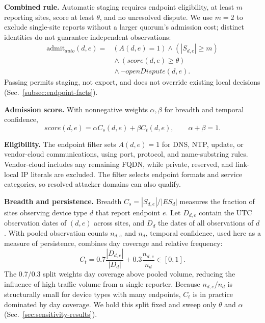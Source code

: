 \documentclass[journal]{IEEEtran}
\theoremstyle{definition}
\begin{document}
\textbf{Combined rule.} Automatic staging requires endpoint eligibility, at least $m$ reporting sites, score at least $\theta$, and no unresolved dispute. We use $m=2$ to exclude single-site reports without a larger quorum's admission cost; distinct identities do not guarantee independent observations:
\begin{equation}
\begin{aligned}
\mathrm{admit}_{auto}(d,e)
={}&(A(d,e)=1)\wedge(|S_{d,e}|\ge m)\\
 &{}\wedge(score(d,e)\ge\theta)\\
 &{}\wedge\neg openDispute(d,e).
\end{aligned}
\label{eq:admitauto}
\end{equation}
Passing permits staging, not export, and does not override existing local decisions (Sec.~\ref{subsec:endpoint-facts}).

\textbf{Admission score.} With nonnegative weights $\alpha,\beta$ for breadth and temporal confidence,
\begin{equation}
score(d,e)=\alpha C_s(d,e)+\beta C_t(d,e),
\qquad \alpha+\beta=1 .
\label{eq:score}
\end{equation}

\textbf{Eligibility.} The endpoint filter sets $A(d,e)=1$ for DNS, NTP, update, or vendor-cloud communications, using port, protocol, and name-substring rules. Vendor-cloud includes any remaining FQDN, while private, reserved, and link-local IP literals are excluded. The filter selects endpoint formats and service categories, so resolved attacker domains can also qualify.

\textbf{Breadth and persistence.} Breadth $C_s=|S_{d,e}|/|ES_d|$ measures the fraction of sites observing device type $d$ that report endpoint $e$. Let $D_{d,e}$ contain the UTC observation dates of $(d,e)$ across sites, and $D_d$ the dates of all observations of $d$. With pooled observation counts $n_{d,e}$ and $n_d$, temporal confidence, used here as a measure of persistence, combines day coverage and relative frequency:
\begin{equation}
C_t=0.7\frac{|D_{d,e}|}{|D_d|}+0.3\frac{n_{d,e}}{n_d}\in[0,1].
\label{eq:ct}
\end{equation}
The 0.7/0.3 split weights day coverage above pooled volume, reducing the influence of high traffic volume from a single reporter. Because $n_{d,e}/n_d$ is structurally small for device types with many endpoints, $C_t$ is in practice dominated by day coverage. We hold this split fixed and sweep only $\theta$ and $\alpha$ (Sec.~\ref{sec:sensitivity-results}).
\end{document}
